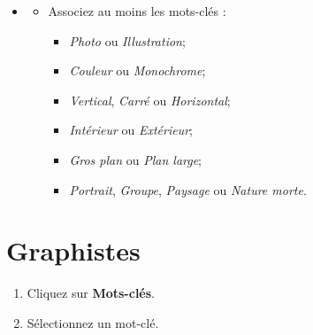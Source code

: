 \documentclass[12pt,nofoldmark,notumble]{leaflet}
\begin{document}
\vspace*{\fill}

\begin{itemize}
  \item[]
  \begin{itemize}
  \item Associez au moins les mots-clés :

    \begin{itemize}
    \item \emph{Photo} ou \emph{Illustration};
    \item \emph{Couleur} ou \emph{Monochrome};
    \item \emph{Vertical}, \emph{Carré} ou \emph{Horizontal};
    \item \emph{Intérieur} ou \emph{Extérieur};
    \item \emph{Gros plan} ou \emph{Plan large};
    \item \emph{Portrait}, \emph{Groupe}, \emph{Paysage} ou \emph{Nature morte}.
    \end{itemize}
  \end{itemize}
\end{itemize}
\vspace*{\fill}


\clearpage

\section{\faPaintBrush Graphistes}

\vspace*{\fill}

\begin{enumerate}[itemsep=0mm,leftmargin=*]

\item Cliquez sur \textbf{Mots-clés}.
\item Sélectionnez un mot-clé.
\end{enumerate}
\begin{center}
  \setlength{\fboxsep}{0pt}%
  \setlength{\fboxrule}{0pt}%
\end{center}
\end{document}
